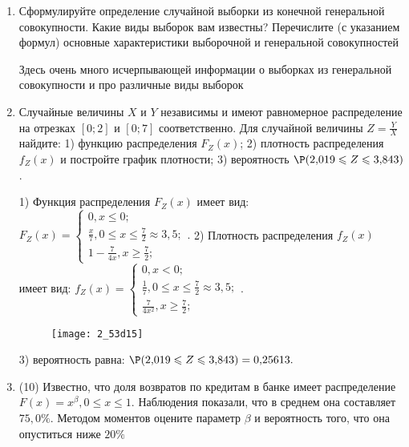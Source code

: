\documentclass[a4paper,12pt]{article}
\begin{document}
\begin{enumerate}


\item


Сформулируйте определение случайной выборки из конечной генеральной совокупности. Какие
виды выборок вам известны? Перечислите (с указанием формул) основные характеристики выборочной и генеральной совокупностей




Здесь очень много исчерпывающей информации о выборках из генеральной совокупности и про различные виды выборок


\item



Случайные величины $X$ и $Y$ независимы и имеют равномерное
распределение на отрезках $[0;2]$ и $[0;7]$ соответственно. Для случайной величины $Z=\frac{Y}{X}$ найдите: 
1) функцию распределения $F_Z(x)$;
2) плотность распределения $f_Z(x)$ и постройте график плотности;
3) вероятность $\P(2,\!019\leqslant Z\leqslant 3,\!843)$.




1) Функция распределения $F_Z(x)$ имеет вид:
$
F_Z(x)=\left\{
\begin{array}{l}
0, x\leqslant 0;\\
\frac{x}{7}, 0\leqslant x\leqslant \frac{7}{2}\approx 3,\!5;\\
1 - \frac{7}{4 x}, x\geqslant\frac{7}{2};
\end{array}.
\right.
$
2) Плотность распределения $f_Z(x)$ имеет вид:
$
f_Z(x)=\left\{
\begin{array}{l}
0, x<0;\\
\frac{1}{7}, 0\leqslant x\leqslant \frac{7}{2}\approx 3,\!5;\\
\frac{7}{4 x^{2}}, x\geqslant\frac{7}{2};
\end{array}.
\right.
$


\begin{figure}[H]
    \texttt{[image: 2\_53d15]}
\end{figure}


3) вероятность равна:
$
\P(2,\!019\leqslant Z\leqslant 3,\!843)=
0,\!25613.
$


\item


(10) Известно, что доля возвратов по кредитам в банке имеет распределение $F(x) = x ^{\beta}, 0 \leqslant x \leqslant 1$.
Наблюдения показали, что в среднем она составляет $75,0\%$. Методом моментов оцените параметр $\beta$ и
вероятность того, что она опуститься ниже $20\%$





\end{enumerate}
\end{document}
